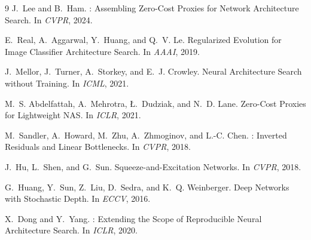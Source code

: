\documentclass[10pt,twocolumn]{article}
\begin{document}

\begin{thebibliography}{9}
J.~Lee and B.~Ham.
: Assembling Zero-Cost Proxies for Network Architecture Search.
\newblock In \emph{CVPR}, 2024.

E.~Real, A.~Aggarwal, Y.~Huang, and Q.~V. Le.
\newblock Regularized Evolution for Image Classifier Architecture Search.
\newblock In \emph{AAAI}, 2019.

J.~Mellor, J.~Turner, A.~Storkey, and E.~J. Crowley.
\newblock Neural Architecture Search without Training.
\newblock In \emph{ICML}, 2021.

M.~S. Abdelfattah, A.~Mehrotra, {\L}.~Dudziak, and N.~D. Lane.
\newblock Zero-Cost Proxies for Lightweight NAS.
\newblock In \emph{ICLR}, 2021.

M.~Sandler, A.~Howard, M.~Zhu, A.~Zhmoginov, and L.-C. Chen.
: Inverted Residuals and Linear Bottlenecks.
\newblock In \emph{CVPR}, 2018.

J.~Hu, L.~Shen, and G.~Sun.
\newblock Squeeze-and-Excitation Networks.
\newblock In \emph{CVPR}, 2018.

G.~Huang, Y.~Sun, Z.~Liu, D.~Sedra, and K.~Q. Weinberger.
\newblock Deep Networks with Stochastic Depth.
\newblock In \emph{ECCV}, 2016.

X.~Dong and Y.~Yang.
: Extending the Scope of Reproducible Neural
Architecture Search.
\newblock In \emph{ICLR}, 2020.
\end{thebibliography}
\end{document}
